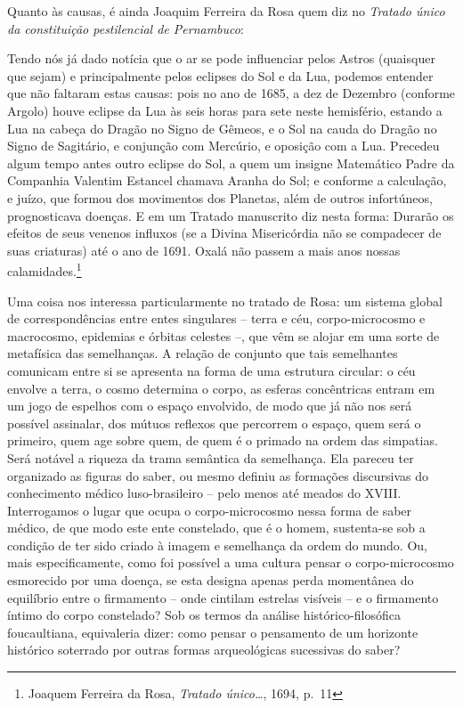 Quanto às causas, é ainda Joaquim Ferreira da Rosa quem diz no
\emph{Tratado único da constituição pestilencial de Pernambuco}:

Tendo nós já dado notícia que o ar se pode influenciar pelos Astros
(quaisquer que sejam) e principalmente pelos eclipses do Sol e da Lua,
podemos entender que não faltaram estas causas: pois no ano de 1685, a
dez de Dezembro (conforme Argolo) houve eclipse da Lua às seis horas
para sete neste hemisfério, estando a Lua na cabeça do Dragão no Signo
de Gêmeos, e o Sol na cauda do Dragão no Signo de Sagitário, e conjunção
com Mercúrio, e oposição com a Lua. Precedeu algum tempo antes outro
eclipse do Sol, a quem um insigne Matemático Padre da Companhia Valentim
Estancel chamava Aranha do Sol; e conforme a calculação, e juízo, que
formou dos movimentos dos Planetas, além de outros infortúneos,
prognosticava doenças. E em um Tratado manuscrito diz nesta forma:
Durarão os efeitos de seus venenos influxos (se a Divina Misericórdia
não se compadecer de suas criaturas) até o ano de 1691. Oxalá não passem
a mais anos nossas calamidades.\footnote{Joaquem Ferreira da Rosa,
  \emph{Tratado único\ldots{}}, 1694, p.~11}

Uma coisa nos interessa particularmente no tratado de Rosa: um sistema
global de correspondências entre entes singulares -- terra e céu,
corpo-microcosmo e macrocosmo, epidemias e órbitas celestes --, que vêm
se alojar em uma sorte de metafísica das semelhanças. A relação de
conjunto que tais semelhantes comunicam entre si se apresenta na forma
de uma estrutura circular: o céu envolve a terra, o cosmo determina o
corpo, as esferas concêntricas entram em um jogo de espelhos com o
espaço envolvido, de modo que já não nos será possível assinalar, dos
mútuos reflexos que percorrem o espaço, quem será o primeiro, quem age
sobre quem, de quem é o primado na ordem das simpatias. Será notável a
riqueza da trama semântica da semelhança. Ela pareceu ter organizado as
figuras do saber, ou mesmo definiu as formações discursivas do
conhecimento médico luso-brasileiro -- pelo menos até meados do XVIII.
Interrogamos o lugar que ocupa o corpo-microcosmo nessa forma de saber
médico, de que modo este ente constelado, que é o homem, sustenta-se sob
a condição de ter sido criado à imagem e semelhança da ordem do mundo.
Ou, mais especificamente, como foi possível a uma cultura pensar o
corpo-microcosmo esmorecido por uma doença, se esta designa apenas perda
momentânea do equilíbrio entre o firmamento -- onde cintilam estrelas
visíveis -- e o firmamento íntimo do corpo constelado? Sob os termos da
análise histórico-filosófica foucaultiana, equivaleria dizer: como
pensar o pensamento de um horizonte histórico soterrado por outras
formas arqueológicas sucessivas do saber?

